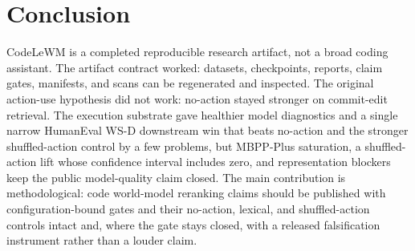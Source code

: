 \documentclass[11pt]{article}
\newcommand{\modelname}{CodeLeWM}
\begin{document}
\section{Conclusion}

\modelname{} is a completed reproducible research artifact, not a broad coding
assistant. The artifact contract worked: datasets, checkpoints, reports,
claim gates, manifests, and scans can be regenerated and inspected. The
original action-use hypothesis did not work: no-action stayed stronger on
commit-edit retrieval. The execution substrate gave healthier model diagnostics
and a single narrow HumanEval WS-D downstream win that beats no-action and the
stronger shuffled-action control by a few problems, but MBPP-Plus saturation, a
shuffled-action lift whose confidence interval includes zero, and representation
blockers keep the public model-quality claim closed. The main contribution is
methodological: code world-model reranking claims should be published with
configuration-bound gates and their no-action, lexical, and shuffled-action
controls intact and, where the gate stays closed, with a released falsification
instrument rather than a louder claim.



\end{document}
